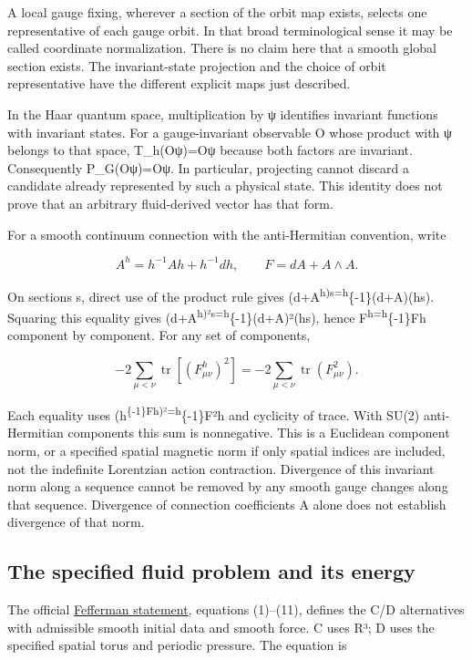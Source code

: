 A local gauge fixing, wherever a section of the orbit map exists,
selects one representative of each gauge orbit. In that broad
terminological sense it may be called coordinate normalization. There is
no claim here that a smooth global section exists. The invariant-state
projection and the choice of orbit representative have the different
explicit maps just described.

In the Haar quantum space, multiplication by ψ identifies invariant
functions with invariant states. For a gauge-invariant observable O
whose product with ψ belongs to that space, T\_h(Oψ)=Oψ because both
factors are invariant. Consequently P\_G(Oψ)=Oψ. In particular,
projecting cannot discard a candidate already represented by such a
physical state. This identity does not prove that an arbitrary
fluid-derived vector has that form.

For a smooth continuum connection with the anti-Hermitian convention,
write

\[
A^h=h^{-1}Ah+h^{-1}dh,\qquad F=dA+A\wedge A.
\]

On sections s, direct use of the product rule gives
(d+A\textsuperscript{h)s=h}\{-1\}(d+A)(hs). Squaring this equality gives
(d+A\textsuperscript{h)²s=h}\{-1\}(d+A)²(hs), hence
F\textsuperscript{h=h}\{-1\}Fh component by component. For any set of
components,

\[
-2\sum_{\mu<\nu}\operatorname{tr}[(F^h_{\mu\nu})^2]
=-2\sum_{\mu<\nu}\operatorname{tr}(F_{\mu\nu}^2).
\]

Each equality uses (h\textsuperscript{\{-1\}Fh)²=h}\{-1\}F²h and
cyclicity of trace. With SU(2) anti-Hermitian components this sum is
nonnegative. This is a Euclidean component norm, or a specified spatial
magnetic norm if only spatial indices are included, not the indefinite
Lorentzian action contraction. Divergence of this invariant norm along a
sequence cannot be removed by any smooth gauge changes along that
sequence. Divergence of connection coefficients A alone does not
establish divergence of that norm.

\subsection{The specified fluid problem and its
energy}\label{gauge-and-navier-stokes-bridge-md-the-specified-fluid-problem-and-its-energy}

The official
\href{https://www.claymath.org/wp-content/uploads/2022/06/navierstokes.pdf}{Fefferman
statement}, equations (1)--(11), defines the C/D alternatives with
admissible smooth initial data and smooth force. C uses R³; D uses the
specified spatial torus and periodic pressure. The equation is

